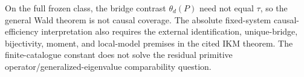 On the full frozen class, the bridge contrast \(\theta_d(P)\) need not equal \(\tau\), so the general Wald theorem is not causal coverage. The absolute fixed-system causal-efficiency interpretation also requires the external identification, unique-bridge, bijectivity, moment, and local-model premises in the cited IKM theorem. The finite-catalogue constant does not solve the residual primitive operator/generalized-eigenvalue comparability question.